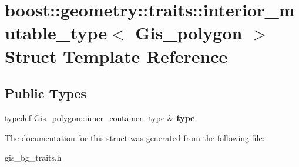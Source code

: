 \hypertarget{structboost_1_1geometry_1_1traits_1_1interior__mutable__type_3_01Gis__polygon_01_4}{}\section{boost\+:\+:geometry\+:\+:traits\+:\+:interior\+\_\+mutable\+\_\+type$<$ Gis\+\_\+polygon $>$ Struct Template Reference}
\label{structboost_1_1geometry_1_1traits_1_1interior__mutable__type_3_01Gis__polygon_01_4}
\subsection*{Public Types}
\begin{DoxyCompactItemize}
\item 
\mbox{\label{structboost_1_1geometry_1_1traits_1_1interior__mutable__type_3_01Gis__polygon_01_4_ab1cdc13ef2946ad5d81a46c8c2ea5289}} 
typedef \mbox{\hyperlink{classGis__wkb__vector}{Gis\+\_\+polygon\+::inner\+\_\+container\+\_\+type}} \& {\bfseries type}
\end{DoxyCompactItemize}


The documentation for this struct was generated from the following file\+:\begin{DoxyCompactItemize}
\item 
gis\+\_\+bg\+\_\+traits.\+h\end{DoxyCompactItemize}
